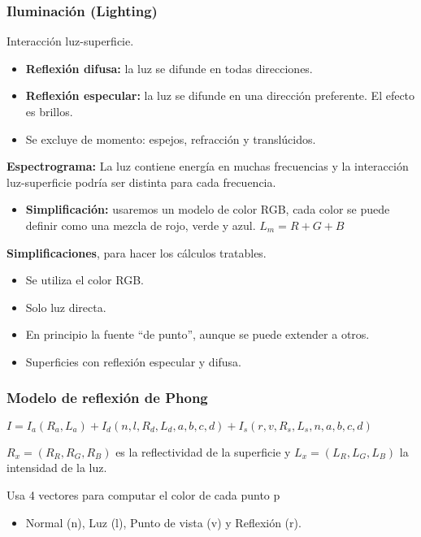 \subsubsection{Iluminación (Lighting)}
Interacción luz-superficie.
\begin{itemize}
	\item \textbf{Reflexión difusa:} la luz se difunde en todas direcciones.
	\item \textbf{Reflexión especular:} la luz se difunde en una dirección preferente. El efecto es brillos.
	\item Se excluye de momento: espejos, refracción y translúcidos.
\end{itemize}

\textbf{Espectrograma:} La luz contiene energía en muchas frecuencias y la interacción luz-superficie podría ser distinta para cada frecuencia. 
\begin{itemize}
	\item \textbf{Simplificación:} usaremos un modelo de color RGB, cada color se puede definir como una mezcla de rojo, verde y azul. $L_m=R+G+B$
\end{itemize}

\textbf{Simplificaciones}, para hacer los cálculos tratables.
\begin{itemize}
	\item Se utiliza el color RGB.
	\item Solo luz directa.
	\item En principio la fuente \enquote{de punto}, aunque se puede extender a otros.
	\item Superficies con reflexión especular y difusa.
\end{itemize}

\subsubsection{Modelo de reflexión de Phong}
$I=I_a(R_a,L_a)+I_d(n, l, R_d, L_d, a, b, c, d)+I_s(r,v, R_s, L_s, n, a, b, c, d)$

$R_x=(R_R, R_G, R_B)$ es la reflectividad de la superficie y $L_x=(L_R, L_G, L_B)$ la intensidad de la luz.

Usa 4 vectores para computar el color de cada punto p
\begin{itemize}
	\item Normal (n), Luz (l), Punto de vista (v) y Reflexión (r).
\end{itemize}

